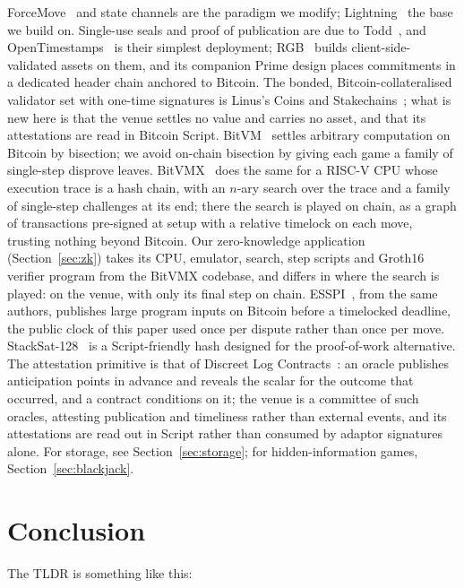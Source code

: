 \documentclass[11pt]{article}
\begin{document}
ForceMove~\cite{forcemove} and state channels are the paradigm we
modify; Lightning~\cite{lightning} the base we build on. Single-use seals
and proof of publication are due to Todd~\cite{toddseals}, and
OpenTimestamps~\cite{ots} is their simplest deployment; RGB~\cite{rgb}
builds client-side-validated assets on them, and its companion Prime
design places commitments in a dedicated header chain anchored to
Bitcoin. The bonded, Bitcoin-collateralised validator set with one-time
signatures is Linus's Coins and Stakechains~\cite{coins}; what is new
here is that the venue settles no value and carries no asset, and that
its attestations are read in Bitcoin Script. BitVM~\cite{bitvm} settles
arbitrary computation on Bitcoin by bisection; we avoid on-chain
bisection by giving each game a family of single-step disprove leaves.
BitVMX~\cite{bitvmx} does the same for a RISC-V CPU whose execution
trace is a hash chain, with an $n$-ary search over the trace and a
family of single-step challenges at its end; there the search is played
on chain, as a graph of transactions pre-signed at setup with a relative
timelock on each move, trusting nothing beyond Bitcoin. Our
zero-knowledge application (Section~\ref{sec:zk}) takes its CPU,
emulator, search, step scripts and Groth16 verifier program from the
BitVMX codebase, and differs in where the search is played: on the
venue, with only its final step on chain. ESSPI~\cite{esspi}, from the
same authors, publishes large program inputs on Bitcoin before a
timelocked deadline, the public clock of this paper used once per
dispute rather than once per move.
StackSat-128~\cite{stacksat} is a Script-friendly hash designed for the
proof-of-work alternative. The attestation primitive is that of Discreet
Log Contracts~\cite{dlc}: an oracle publishes anticipation points in
advance and reveals the scalar for the outcome that occurred, and a
contract conditions on it; the venue is a committee of such oracles,
attesting publication and timeliness rather than external events, and
its attestations are read out in Script rather than consumed by adaptor
signatures alone. For storage, see Section~\ref{sec:storage}; for hidden-information games, Section~\ref{sec:blackjack}.

\section{Conclusion}

The TLDR is something like this:
\end{document}
